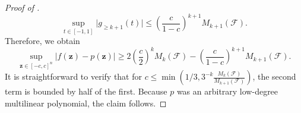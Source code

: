 \begin{proof}[Proof of ]
\begin{equation*}
    \sup_{t\in [-1,1]} \vert g_{\geq k+1}(t)\vert\leq \left(\frac{c}{1-c}\right)^{k+1}M_{k+1}(\mathcal{F}).
\end{equation*}
Therefore, we obtain
\begin{equation*}
    \sup_{\mathbf{z}\in [-c,c]^n} \vert f(\mathbf{z})-p(\mathbf{z})\vert\geq 2\left(\frac{c}{2}\right)^kM_k(\mathcal{F})-\left(\frac{c}{1-c}\right)^{k+1}M_{k+1}(\mathcal{F}).
\end{equation*}
It is straightforward to verify that for $c\leq \min\left(1/3, 3^{-k}  \frac{M_k(\mathcal{F})}{M_{k+1}(\mathcal{F})}\right)$, the second term is bounded by half of the first. Because $p$ was an arbitrary low-degree multilinear polynomial, the claim follows.
\end{proof}



















































































